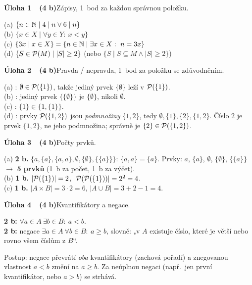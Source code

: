 \documentclass[11pt,a4paper]{article}
\newcommand{\zad}[2]{\par\Needspace*{4cm}\vspace{1.1em}\noindent\textcolor{accent}{\sffamily\bfseries #1}\enspace #2\par}
\begin{document}
\newpage
{}

\zad{Úloha 1\ \ (4 b)}{Zápisy, 1~bod za každou správnou položku.}
\begin{reseni}
(a) $\{n\in\mathbb N\mid 4\mathrel{\mid} n\lor 6\mathrel{\mid} n\}$\\
(b) $\{x\in X\mid\forall y\in Y:\ x<y\}$\\
(c) $\{3x\mid x\in X\}=\{n\in\mathbb N\mid\exists x\in X:\ n=3x\}$\\
(d) $\{S\in\mathcal P(M)\mid |S|\ge2\}$ (nebo $\{S\mid S\subseteq M\land|S|\ge2\}$)
\end{reseni}

\zad{Úloha 2\ \ (4 b)}{Pravda / nepravda, 1~bod za položku se zdůvodněním.}
\begin{reseni}
(a) \pravda: $\emptyset\in\mathcal P(\{1\})$, takže jediný prvek $\{\emptyset\}$ leží v $\mathcal P(\{1\})$.\\
(b) \nepravda: jediný prvek $\{\{\emptyset\}\}$ je $\{\emptyset\}$, nikoli $\emptyset$.\\
(c) \pravda: $\{1\}\in\{1,\{1\}\}$.\\
(d) \nepravda: prvky $\mathcal P(\{1,2\})$ jsou \emph{podmnožiny} $\{1,2\}$, tedy $\emptyset,\{1\},\{2\},\{1,2\}$. Číslo $2$ je prvek $\{1,2\}$, ne jeho podmnožina; správně je $\{2\}\in\mathcal P(\{1,2\})$.
\end{reseni}

\zad{Úloha 3\ \ (4 b)}{Počty prvků.}
\begin{reseni}
(a) \textbf{2 b.} $\{a,\{a\},\{a,a\},\emptyset,\{\emptyset\},\{\{a\}\}\}$: $\{a,a\}=\{a\}$. Prvky: $a$, $\{a\}$, $\emptyset$, $\{\emptyset\}$, $\{\{a\}\}$ $\to$ \textbf{5 prvků} (1~b za počet, 1~b za výčet).\\
(b) \textbf{1 b.} $|\mathcal P(\{1\})|=2$, $|\mathcal P(\mathcal P(\{1\}))|=2^2=4$.\\
(c) \textbf{1 b.} $|A\times B|=3\cdot2=6$, $|A\cup B|=3+2-1=4$.
\end{reseni}

\zad{Úloha 4\ \ (4 b)}{Kvantifikátory a negace.}
\begin{reseni}
\textbf{2 b:} $\forall a\in A\ \exists b\in B:\ a<b$.\\
\textbf{2 b:} negace $\exists a\in A\ \forall b\in B:\ a\ge b$, slovně: „v $A$ existuje číslo, které je větší nebo rovno všem číslům z $B$“.

\smallskip
{\sffamily\footnotesize\color{muted}Postup: negace převrátí \emph{oba} kvantifikátory (zachová pořadí) a znegovanou vlastnost $a<b$ změní na $a\ge b$. Za neúplnou negaci (např.\ jen první kvantifikátor, nebo $a>b$) se strhává.}
\end{reseni}
\end{document}
